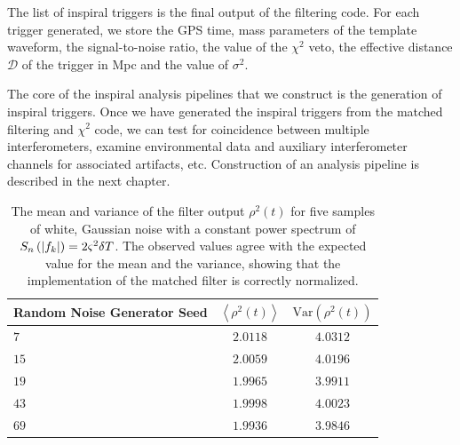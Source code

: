 The list of inspiral triggers is the final output of the filtering code. For
each trigger generated, we store the GPS time, mass parameters of the
template waveform, the signal-to-noise ratio, the value of the $\chi^2$ veto, the
effective distance $\mathcal{D}$ of the trigger in Mpc and the value of
$\sigma^2$.

The core of the inspiral analysis pipelines that we construct is the generation of
inspiral triggers. Once we have generated the inspiral triggers from the
matched filtering and $\chi^2$ code, we can test for coincidence
between multiple interferometers, examine environmental data and auxiliary
interferometer channels for associated artifacts, etc.  Construction of an
analysis pipeline is described in the next chapter.


\begin{table}[p]
\label{t:normresults}
\begin{center}
\begin{tabular}{l|c|c}
Random Noise Generator Seed& $\left\langle \rho^2(t) \right\rangle$ & $\mathrm{Var}( \rho^2(t) )$\\
\hline
$7$ & $2.0118$ & $4.0312$ \\
$15$ & $2.0059$ & $4.0196$ \\
$19$ & $1.9965$ & $3.9911$ \\
$43$ & $1.9998$ & $4.0023$ \\
$69$ & $1.9936$ & $3.9846$ \\
\end{tabular}
\end{center}
\caption[Mean and Variance of the Matched Filter Output for Gaussian Noise]{%
The mean and variance of the filter output $\rho^2(t)$ for five samples of
white, Gaussian noise with a constant power spectrum of $S_n\left(\left|f_{k}\right|\right) =
2\varsigma^2\delta T$. The observed values agree with the expected value for the
mean and the variance, showing that the implementation of the matched
filter is correctly normalized.
}
\end{table}

\newpage

